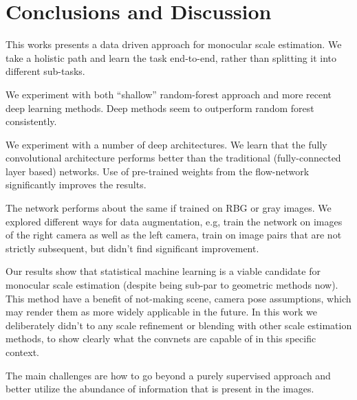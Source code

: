 \section{Conclusions and Discussion}

This works presents a data driven approach for monocular scale
estimation.  We take a holistic path and learn the task end-to-end,
rather than splitting it into different sub-tasks.

We experiment with both ``shallow'' random-forest approach and more
recent deep learning methods.  Deep methods seem to outperform random
forest consistently.

We experiment with a number of deep architectures. We learn that the
fully convolutional architecture performs better than the traditional
(fully-connected layer based) networks.  Use of pre-trained weights
from the flow-network significantly improves the results.

The network performs about the same if trained on RBG or gray images.
We explored different ways for data augmentation, e.g, train the
network on images of the right camera as well as the left camera,
train on image pairs that are not strictly subsequent, but didn't find
significant improvement.

Our results show that statistical machine learning is a viable
candidate for monocular scale estimation (despite being sub-par to
geometric methods now).  This method have a benefit of not-making
scene, camera pose assumptions, which may render them as more widely
applicable in the future.  In this work we deliberately didn't to any
scale refinement or blending with other scale estimation methods, to
show clearly what the convnets are capable of in this specific
context.

The main challenges are how to go beyond a purely supervised approach
and better utilize the abundance of information that is present in the
images.

